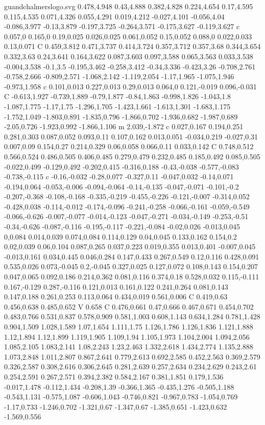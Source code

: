 \begin{filecontents}[noheader]{guandchalmerslogo.svg}
0.478,4.948 0.43,4.888 0.382,4.828 0.224,4.654 0.17,4.595 0.115,4.535 0.071,4.326 0.055,4.291 0.019,4.212 -0.027,4.101 -0.056,4.04 -0.086,3.977 -0.13,3.879 -0.197,3.725 -0.264,3.571 -0.175,3.627 -0.119,3.627 c 0.057,0 0.165,0 0.19,0.025 0.026,0.025 0.061,0.052 0.15,0.052 0.088,0 0.022,0.033 0.13,0.071 C 0.459,3.812 0.471,3.737 0.414,3.724 0.357,3.712 0.357,3.68 0.344,3.654 0.332,3.63 0.24,3.641 0.164,3.622 0.087,3.603 0.097,3.588 0.065,3.563 0.033,3.538 -0.004,3.538 -0.1,3.5 -0.195,3.462 -0.258,3.412 -0.34,3.336 -0.423,3.26 -0.708,2.761 -0.758,2.666 -0.809,2.571 -1.068,2.142 -1.119,2.054 -1.17,1.965 -1.075,1.946 -0.973,1.958 c 0.101,0.013 0.227,0.013 0.29,0.013 0.064,0 0.121,-0.019 0.096,-0.031 C -0.613,1.927 -0.739,1.889 -0.79,1.877 -0.84,1.863 -0.998,1.826 -1.043,1.8 -1.087,1.775 -1.17,1.75 -1.296,1.705 -1.423,1.661 -1.613,1.301 -1.683,1.175 -1.752,1.049 -1.803,0.891 -1.835,0.796 -1.866,0.702 -1.936,0.682 -1.987,0.689 -2.05,0.726 -1.923,0.992 -1.866,1.106 m 2.039,-1.872 c 0.027,0.167 0.194,0.251 0.281,0.303 0.087,0.052 0.093,0.11 0.107,0.162 0.013,0.051 -0.034,0.219 -0.027,0.31 0.007,0.09 0.154,0.27 0.214,0.329 0.06,0.058 0.066,0.11 0.033,0.142 C 0.748,0.512 0.566,0.524 0.486,0.505 0.406,0.485 0.279,0.479 0.232,0.485 0.185,0.492 0.085,0.505 -0.022,0.499 -0.129,0.492 -0.202,0.415 -0.316,0.188 -0.43,-0.038 -0.577,-0.083 -0.738,-0.115 c -0.16,-0.032 -0.28,0.077 -0.327,0.11 -0.047,0.032 -0.14,0.071 -0.194,0.064 -0.053,-0.006 -0.094,-0.064 -0.14,-0.135 -0.047,-0.071 -0.101,-0.2 -0.207,-0.368 -0.108,-0.168 -0.335,-0.219 -0.455,-0.226 -0.121,-0.007 -0.314,0.052 -0.428,0.038 -0.114,-0.012 -0.174,-0.096 -0.241,-0.258 -0.066,-0.161 -0.059,-0.549 -0.066,-0.626 -0.007,-0.077 -0.014,-0.123 -0.047,-0.271 -0.034,-0.149 -0.253,-0.51 -0.34,-0.626 -0.087,-0.116 -0.195,-0.117 -0.221,-0.084 -0.02,0.026 -0.013,0.045 0,0.084 0.014,0.039 0.074,0.084 0.114,0.129 0.04,0.045 0.133,0.162 0.154,0.2 0.02,0.039 0.06,0.104 0.087,0.265 0.037,0.223 0.019,0.355 0.013,0.401 -0.007,0.045 -0.013,0.161 0.034,0.445 0.046,0.284 0.147,0.433 0.267,0.549 0.12,0.116 0.428,0.091 0.535,0.026 0.073,-0.045 0.2,-0.045 0.327,0.025 0.127,0.072 0.108,0.143 0.154,0.207 0.047,0.065 0.092,0.186 0.214,0.362 0.081,0.116 0.374,0.18 0.528,0.032 0.115,-0.111 0.167,-0.129 0.287,-0.116 0.121,0.013 0.161,0.122 0.241,0.264 0.081,0.143 0.147,0.188 0.261,0.253 0.113,0.064 0.434,0.019 0.561,0.006 C 0.419,0.63 0.456,0.638 0.485,0.652 V 0.658 C 0.476,0.661 0.47,0.666 0.467,0.671 0.454,0.702 0.483,0.766 0.531,0.837 0.578,0.909 0.581,1.003 0.608,1.143 0.634,1.284 0.781,1.428 0.904,1.509 1.028,1.589 1.07,1.654 1.111,1.75 1.126,1.786 1.126,1.836 1.121,1.888 1.12,1.894 1.12,1.899 1.119,1.905 1.109,1.94 1.105,1.973 1.104,2.004 1.094,2.056 1.085,2.105 1.083,2.141 1.08,2.243 1.23,2.463 1.332,2.618 1.434,2.774 1.135,2.888 1.073,2.848 1.011,2.807 0.867,2.641 0.779,2.613 0.692,2.585 0.452,2.563 0.369,2.579 0.326,2.587 0.308,2.616 0.306,2.645 0.281,2.639 0.257,2.634 0.234,2.629 0.243,2.61 0.254,2.591 0.267,2.571 0.394,2.382 0.584,2.167 0.381,1.851 0.179,1.536 -0.017,1.478 -0.112,1.434 -0.208,1.39 -0.366,1.365 -0.435,1.276 -0.505,1.188 -0.543,1.131 -0.575,1.087 -0.606,1.043 -0.746,0.821 -0.967,0.783 -1.054,0.769 -1.17,0.733 -1.246,0.702 -1.321,0.67 -1.347,0.67 -1.385,0.651 -1.423,0.632 -1.569,0.556 
\end{filecontents}

